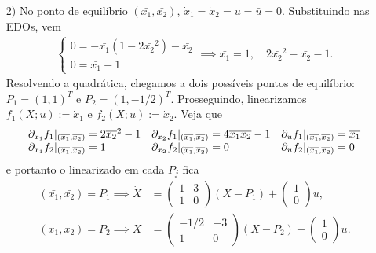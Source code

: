 \begin{enumerate}
		\item [2)]
		No ponto de equilíbrio $(\bar{x_1}, \bar{x_2})$, 
		$\dot{x}_1 = \dot{x}_2 = u = \bar{u} = 0$. 
		Substituindo nas EDOs, vem 
		\begin{align*}
			\left\{	
				\begin{array}{l}
					0 = -\bar{x_1}(1 - 2\bar{x_2}^2) - \bar{x_2} \\
					0 = \bar{x_1} - 1
				\end{array}
			\right.
			\implies 
			\bar{x_1} = 1, \quad 2\bar{x_2}^2 - \bar{x_2} - 1.
		\end{align*}
		Resolvendo a quadrática, chegamos a dois possíveis pontos de equilíbrio: 
		$P_1 = (1, 1)^T$ e $P_2 = (1, -1/2)^T$.
		Prosseguindo, linearizamos 
		$f_1(X;u) := \dot{x}_1$ e 
		$f_2(X;u) := \dot{x}_2$.
		Veja que
		\[
			\begin{array}{lll}				
				\partial_{x_1}f_1|_{(\overline{x_1}, \overline{x_2})}
				= 2\overline{x_2}^2-1  
				&
				\partial_{x_2}f_1|_{(\overline{x_1}, \overline{x_2}) }
				= 4\overline{x_1x_2}-1
				&
				\partial_u f_1|_{(\overline{x_1}, \overline{x_2})}
				= \overline{x_1} 
				\\
				\partial_{x_1}f_2|_{(\overline{x_1}, \overline{x_2})}
				= 1 
				&
				\partial_{x_2}f_2|_{(\overline{x_1}, \overline{x_2}) }
				= 0
				&
				\partial_u f_2|_{(\overline{x_1}, \overline{x_2})}
				= 0 
			\end{array}
		\]
		e portanto o linearizado em cada $P_j$ fica
		\begin{align*}
			(\bar{x_1}, \bar{x_2}) = P_1 \implies
			\dot{X} &= 
			\begin{pmatrix} 
				1 & 3 \\ 1 & 0
			\end{pmatrix}
			(X-P_1) +
			\begin{pmatrix} 
				1 \\ 0
			\end{pmatrix}
			u,
			\\
			(\bar{x_1}, \bar{x_2}) = P_2 \implies
			\dot{X} &= 
			\begin{pmatrix} 
				-1/2 & -3 \\ 1 & 0
			\end{pmatrix}
			(X-P_2) +
			\begin{pmatrix} 
				1 \\ 0
			\end{pmatrix}
			u.
		\end{align*}
		

\end{enumerate}
